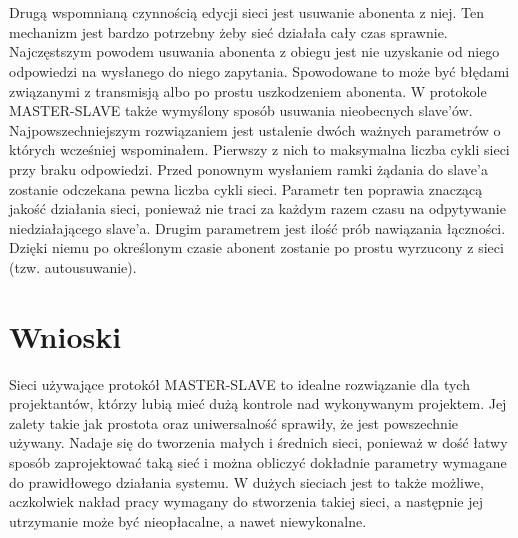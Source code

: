 		\\
		\\
		Drugą wspomnianą czynnością edycji sieci jest usuwanie abonenta z niej. Ten mechanizm jest bardzo potrzebny żeby sieć działała cały czas sprawnie. Najczęstszym powodem usuwania abonenta z obiegu jest nie uzyskanie od niego odpowiedzi na wysłanego do niego zapytania. Spowodowane to może być błędami związanymi z transmisją albo po prostu uszkodzeniem abonenta. W protokole MASTER-SLAVE także wymyślony sposób usuwania nieobecnych slave'ów. Najpowszechniejszym rozwiązaniem jest ustalenie dwóch ważnych parametrów o których wcześniej wspominałem. Pierwszy z nich  to maksymalna liczba cykli sieci przy braku odpowiedzi. Przed ponownym wysłaniem ramki żądania do slave'a zostanie odczekana pewna liczba cykli sieci. Parametr ten poprawia znaczącą jakość działania sieci, ponieważ nie traci za każdym razem czasu na odpytywanie niedziałającego slave'a. Drugim parametrem jest ilość prób nawiązania łączności. Dzięki niemu po określonym czasie abonent zostanie po prostu wyrzucony z sieci (tzw. autousuwanie).
\section{Wnioski}
		Sieci używające protokół MASTER-SLAVE to idealne rozwiązanie dla tych projektantów, którzy lubią mieć dużą kontrole nad wykonywanym projektem. Jej zalety takie jak prostota oraz uniwersalność sprawiły, że jest powszechnie używany. Nadaje się do tworzenia małych i średnich sieci, ponieważ w dość łatwy sposób zaprojektować taką sieć i można obliczyć dokładnie parametry wymagane do prawidłowego działania systemu. W dużych sieciach jest to także możliwe, aczkolwiek nakład pracy wymagany do stworzenia takiej sieci, a następnie jej utrzymanie może być nieopłacalne, a nawet niewykonalne. 
		